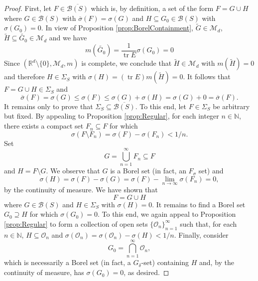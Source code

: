 \documentclass[11pt]{article}
\theoremstyle{theorem}
\newcommand\tr{\operatorname{tr}}
\begin{document}
\begin{proof}
First, let $F\in\overline{\mathcal{B}(S)}$ which is, by definition, a set of the form $F=G\cup H$ where $G\in\mathcal{B}(S)$ with $\overline{\sigma}(F)=\sigma(G)$ and $H\subseteq G_0\in\mathcal{B}(S)$ with $\sigma(G_0)=0$. In view of Proposition \ref{prop:BorelContainment}, $\widetilde{G}\in \mathcal{M}_d$, $\widetilde{H}\subseteq \widetilde{G_0}\in\mathcal{M}_d$ and we have
\begin{equation*}
m(\widetilde{G_0})=\frac{1}{\tr E}\sigma(G_0)=0
\end{equation*}
Since $(\mathbb{R}^d\setminus\{0\},\mathcal{M}_d,m)$ is complete, we conclude that $\widetilde{H}\in\mathcal{M}_d$ with $m(\widetilde{H})=0$ and therefore $H\in\Sigma_S$ with $\sigma(H)=(\tr E)m(\widetilde{H})=0$. It follows that $F=G\cup H\in\Sigma_S$ and
\begin{equation*}
\overline{\sigma}(F)=\sigma(G)\leq \sigma(F)\leq\sigma(G)+\sigma(H)=\sigma(G)+0=\overline{\sigma}(F).
\end{equation*}
It remains only to prove that $\Sigma_S\subseteq\overline{\mathcal{B}(S)}$. To this end, let $F\in\Sigma_S$ be arbitrary but fixed. By appealing to Proposition \ref{prop:Regular}, for each integer $n\in\mathbb{N}$, there exists a compact set $F_n\subseteq F$ for which
\begin{equation*}
\sigma(F\setminus F_n)=\sigma(F)-\sigma(F_n)<1/n.
\end{equation*}
Set
\begin{equation*}
G=\bigcup_{n=1}^\infty F_n\subseteq F
\end{equation*}
and $H=F\setminus G$. 
We observe that $G$ is a Borel set (in fact, an $F_\sigma$ set) and
\begin{equation*}
\sigma(H)=\sigma(F)-\sigma(G)=\sigma(F)-\lim_{n\to\infty}\sigma(F_n)=0,
\end{equation*}
by the continuity of measure. We have shown that
\begin{equation*}
F=G\cup H
\end{equation*}
where $G\in\mathcal{B}(S)$ and $H\in\Sigma_S$ with $\sigma(H)=0$. It remains to find a Borel set $G_0\supseteq H$ for which $\sigma(G_0)=0$. To this end, we again appeal to Proposition \ref{prop:Regular} to form a collection of open sets $\{\mathcal{O}_n\}_{n=1}^\infty$ such that, for each $n\in\mathbb{N}$, $H\subseteq \mathcal{O}_n$ and $\sigma(\mathcal{O}_n)=\sigma(\mathcal{O}_n)-\sigma(H)<1/n$. Finally, consider
\begin{equation*}
G_0=\bigcap_{n=1}^\infty\mathcal{O}_n,
\end{equation*}
which is necessarily a Borel set (in fact, a $G_\delta$-set) containing $H$ and, by the continuity of measure, has $\sigma(G_0)=0$, as desired.
\end{proof}
\end{document}
